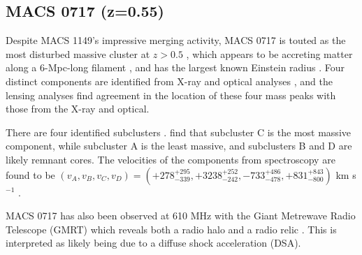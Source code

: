 

\subsection{MACS 0717 (z=0.55)}
\label{sec:results_m0717}



Despite MACS 1149's impressive merging activity, MACS 0717 is touted as the most disturbed massive cluster at $z> 0.5$
\citep{ebeling2007}, which appears to be accreting matter along a 6-Mpc-long filament \citep{ebeling2004}, and has the
largest known Einstein radius \citep[$\theta_e \sim 55$\asec;][]{zitrin2009}. Four distinct components are identified
from X-ray and optical analyses \citep{ma2009}, and the lensing analyses \citep{zitrin2009,limousin2012} find agreement
in the location of these four mass peaks with those from the X-ray and optical. 

There are four identified subclusters \citep[labeled A through D][]{mroczkowski2012}. \citet{ma2009} find that subcluster C is the
most massive component, while subcluster A is the least massive, and subclusters B and D are likely remnant cores. The
velocities of the components from spectroscopy are found to be $(v_A, v_B, v_C, v_D) = (+278_{-339}^{+295},+3238_{-242}^{+252},
-733_{-478}^{+486},+831_{-800}^{+843})$ km s$^{-1}$ \citep{ma2009}. 

MACS 0717 has also been observed at 610 MHz with the Giant Metrewave Radio Telescope (GMRT) which reveals both a radio
halo and a radio relic \citep{vanweeren2009}. This is interpreted as likely being due to a diffuse shock acceleration
(DSA).

